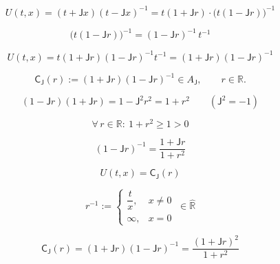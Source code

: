 \documentclass[12pt]{article}
\begin{document}
\begin{equation}
U(t,x)=(t+\mathsf{J}x)(t-\mathsf{J}x)^{-1}=t(1+\mathsf{J}r)\cdot\bigl(t(1-\mathsf{J}r)\bigr)^{-1}
\end{equation}

\begin{equation}
\bigl(t(1-\mathsf{J}r)\bigr)^{-1}=(1-\mathsf{J}r)^{-1}\,t^{-1}
\end{equation}

\begin{equation}
U(t,x)=t(1+\mathsf{J}r)(1-\mathsf{J}r)^{-1}t^{-1}=(1+\mathsf{J}r)(1-\mathsf{J}r)^{-1}
\end{equation}

\begin{equation}
\mathsf{C}_{\mathsf{J}}(r):=(1+\mathsf{J}r)(1-\mathsf{J}r)^{-1}\in A_{\mathsf{J}},\qquad r\in\mathbb{R}.
\end{equation}

\begin{equation}
(1-\mathsf{J}r)(1+\mathsf{J}r)=1-\mathsf{J}^2 r^2=1+r^2\qquad(\mathsf{J}^2=-1)
\end{equation}

\begin{equation}
\forall\,r\in\mathbb{R}:\ 1+r^2\geq 1>0
\end{equation}

\begin{equation}
(1-\mathsf{J}r)^{-1}=\frac{1+\mathsf{J}r}{1+r^2}
\end{equation}

\begin{equation}
U(t,x)=\mathsf{C}_{\mathsf{J}}(r)
\end{equation}

\begin{equation}
r^{-1}:=
\begin{cases}
\dfrac{t}{x},& x\ne 0\\[6pt]
\infty,& x=0
\end{cases}
\ \in\widehat{\mathbb{R}}
\end{equation}


\begin{equation}
\mathsf{C}_{\mathsf{J}}(r)
=(1+\mathsf{J}r)(1-\mathsf{J}r)^{-1}
=\frac{(1+\mathsf{J}r)^2}{1+r^2}
\end{equation}
\end{document}
